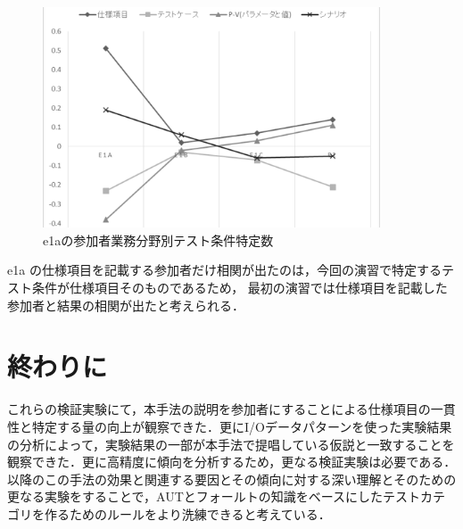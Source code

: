 \documentclass[a4paper,11pt]{jreport}
\begin{document}
\begin{figure}[h]
  \begin{center}
  \includegraphics[width=10cm]{./image/D-3-Fig13.png}
  \caption{e1aの参加者業務分野別テスト条件特定数}
  \label{fig:D-3-Fig13}
  \end{center}
   \end{figure}

e1a の仕様項目を記載する参加者だけ相関が出たのは，今回の演習で特定するテスト条件が仕様項目そのものであるため， 最初の演習では仕様項目を記載した参加者と結果の相関が出たと考えられる．

\section{終わりに}
これらの検証実験にて，本手法の説明を参加者にすることによる仕様項目の一貫性と特定する量の向上が観察できた．更にI/Oデータパターンを使った実験結果の分析によって，実験結果の一部が本手法で提唱している仮説と一致することを観察できた．更に高精度に傾向を分析するため，更なる検証実験は必要である．以降のこの手法の効果と関連する要因とその傾向に対する深い理解とそのための更なる実験をすることで，AUTとフォールトの知識をベースにしたテストカテゴリを作るためのルールをより洗練できると考えている．
\end{document}
